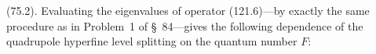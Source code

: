 (75.2). Evaluating the eigenvalues of operator (121.6)---by exactly the same procedure as in Problem~1 of \S~84---gives the following dependence of the quadrupole hyperfine level splitting on the quantum number $F$:
